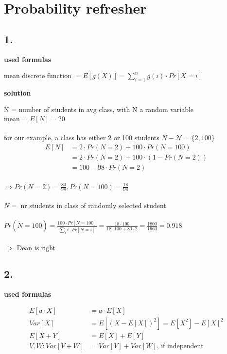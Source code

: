 \section{ Probability refresher }

\subsection*{1.}

\textbf{used formulas}

mean discrete function $= E[g(X)]= \sum_{i=1}^n g(i)\cdot Pr[X=i]$

\textbf{solution}

N = number of students in  avg class, with N a random variable\\
mean = $E[N]=20$\\
\\
for our example, a class has either 2 or 100 students
$N-\mathcal{N}=\{2,100\}$\\

\begin{align*}
E[N]&=2\cdot Pr(N=2)+100\cdot Pr(N=100)\\
&=2\cdot Pr(N=2)+100\cdot (1-Pr(N=2))\\
&=100-98\cdot Pr(N=2)\\
\end{align*}

$\Rightarrow Pr(N=2)=\frac{80}{98},Pr(N=100)=\frac{18}{98}$\\
\\
$\widetilde{N}=$ nr students in class of randomly selected student\\
\\
$Pr(\widetilde{N}=100)=\frac{100\cdot Pr[N=100]}{\sum_{i}i\cdot Pr[N=i]}=\frac{18\cdot 100}{18\cdot 100+80\cdot 2}=\frac{1800}{1960}=0.918$\\
\\
$\Rightarrow$ Dean is right

\subsection*{2.}

\textbf{used formulas}

\begin{align*}
E[a\cdot X] &=a\cdot E[X]\\
Var[X] &= E[(X-E[X])^{2}] = E[X^2] - E[X]^2\\
E[X + Y] &= E[X] + E[Y]\\
V,W:Var[V+W] &= Var[V]+Var[W]\text{, if independent}\\
\end{align*}

